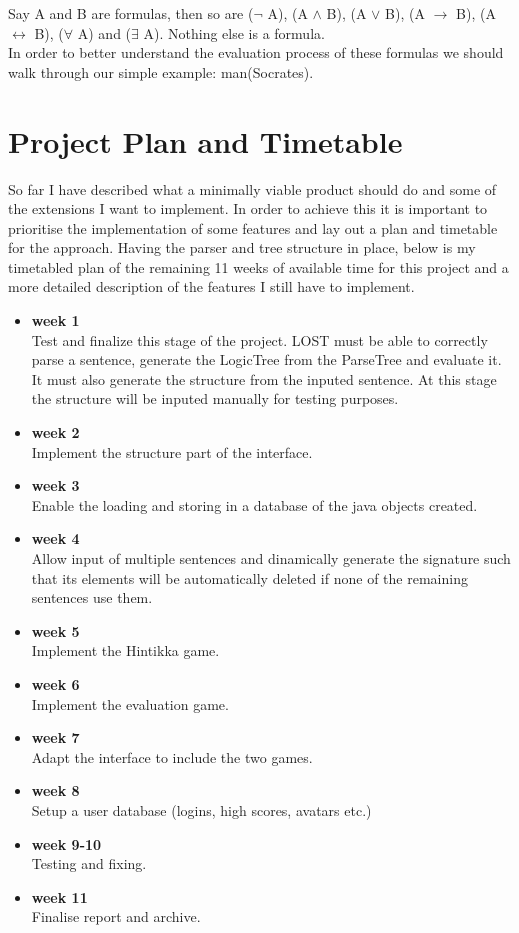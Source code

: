 \documentclass{article}
\begin{document}
\begin{enumerate}
Say A and B are formulas, then so are ($\lnot$ A), (A $\land$ B), (A $\lor$ B), (A $\to$ B), (A $\leftrightarrow$ B), ($\forall$ A) and ($\exists$ A). Nothing else is a formula.\\

In order to better understand the evaluation process of these formulas we should walk through our simple example: man(Socrates).
	\end{enumerate}

\newpage
\section{Project Plan and Timetable}		%
So far I have described what a minimally viable product should do and some of the extensions I want to implement. In order to achieve this it is important to prioritise the implementation of some features and lay out a plan and timetable for the approach. Having the parser and tree structure in place, below is my timetabled plan of the remaining 11 weeks of available time for this project and a more detailed description of the features I still have to implement.

	\begin{itemize}
	\item \textbf{week 1}\\
Test and finalize this stage of the project. LOST must be able to correctly parse a sentence, generate the LogicTree from the ParseTree and evaluate it. It must also generate the structure from the inputed sentence. At this stage the structure will be inputed manually for testing purposes.
	\item \textbf{week 2}\\
Implement the structure part of the interface.
	\item \textbf{week 3}\\
Enable the loading and storing in a database of the java objects created.
	\item \textbf{week 4}\\
Allow input of multiple sentences and dinamically generate the signature such that its elements will be automatically deleted if none of the remaining sentences use them.
	\item \textbf{week 5}\\
Implement the Hintikka game.
	\item \textbf{week 6}\\
Implement the evaluation game.
	\item \textbf{week 7}\\
Adapt the interface to include the two games.
	\item \textbf{week 8}\\
Setup a user database (logins, high scores, avatars etc.)
	\item \textbf{week 9-10}\\
Testing and fixing.
	\item \textbf{week 11}\\
Finalise report and archive.
	\end{itemize}
\end{document}
